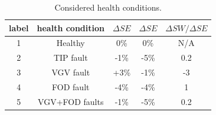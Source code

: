 \documentclass{ecai}
\begin{document}


\begin{table}[h]
\caption{Considered health conditions.}
\label{tab:health_conditions}
\centering
\begin{tabular}{ccccc} 
\toprule
label &  health condition & $\Delta SE$ & $\Delta SE$ & $\Delta SW/\Delta SE$ \\
\midrule
1	& Healthy	& 0\%	& 0\%	& N/A \\
2	& TIP fault	& -1\%	& -5\%	& 0.2 \\
3	& VGV fault	& +3\%	& -1\%	& -3 \\
4	& FOD fault	& -4\%	& -4\%	& 1 \\
5	& VGV+FOD faults	& -1\%	& -5\%	& 0.2 \\
\bottomrule
\end{tabular}
\end{table}
\end{document}
